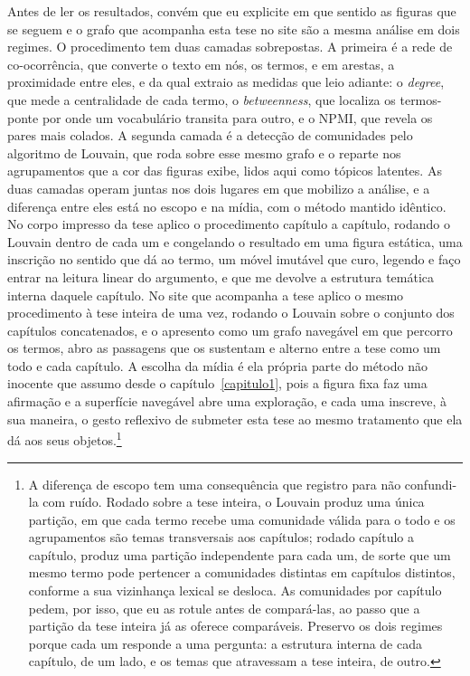 Antes de ler os resultados, convém que eu explicite em que sentido as
figuras que se seguem e o grafo que acompanha esta tese no site são a
mesma análise em dois regimes. O procedimento tem duas camadas
sobrepostas. A primeira é a rede de co-ocorrência, que converte o texto
em nós, os termos, e em arestas, a proximidade entre eles, e da qual
extraio as medidas que leio adiante: o \textit{degree}, que mede a
centralidade de cada termo, o \textit{betweenness}, que localiza os
termos-ponte por onde um vocabulário transita para outro, e o NPMI, que
revela os pares mais colados. A segunda camada é a detecção de
comunidades pelo algoritmo de Louvain, que roda sobre esse mesmo grafo e
o reparte nos agrupamentos que a cor das figuras exibe, lidos aqui como
tópicos latentes. As duas camadas operam juntas nos dois lugares em que
mobilizo a análise, e a diferença entre eles está no escopo e na mídia,
com o método mantido idêntico. No corpo impresso da tese aplico o
procedimento capítulo a capítulo, rodando o Louvain dentro de cada um e
congelando o resultado em uma figura estática, uma inscrição no sentido
que \textcite{Latour1986Visualization} dá ao termo, um móvel imutável que
curo, legendo e faço entrar na leitura linear do argumento, e que me
devolve a estrutura temática interna daquele capítulo. No site que
acompanha a tese aplico o mesmo procedimento à tese inteira de uma vez,
rodando o Louvain sobre o conjunto dos capítulos concatenados, e o
apresento como um grafo navegável em que percorro os termos, abro as
passagens que os sustentam e alterno entre a tese como um todo e cada
capítulo. A escolha da mídia é ela própria parte do método não inocente
que assumo desde o capítulo~\ref{capitulo1}, pois a figura fixa faz uma
afirmação e a superfície navegável abre uma exploração, e cada uma
inscreve, à sua maneira, o gesto reflexivo de submeter esta tese ao mesmo
tratamento que ela dá aos seus objetos.\footnote{A diferença de escopo tem
uma consequência que registro para não confundi-la com ruído. Rodado sobre
a tese inteira, o Louvain produz uma única partição, em que cada termo
recebe uma comunidade válida para o todo e os agrupamentos são temas
transversais aos capítulos; rodado capítulo a capítulo, produz uma
partição independente para cada um, de sorte que um mesmo termo pode
pertencer a comunidades distintas em capítulos distintos, conforme a sua
vizinhança lexical se desloca. As comunidades por capítulo pedem, por
isso, que eu as rotule antes de compará-las, ao passo que a partição da
tese inteira já as oferece comparáveis. Preservo os dois regimes porque
cada um responde a uma pergunta: a estrutura interna de cada capítulo, de
um lado, e os temas que atravessam a tese inteira, de outro.}

